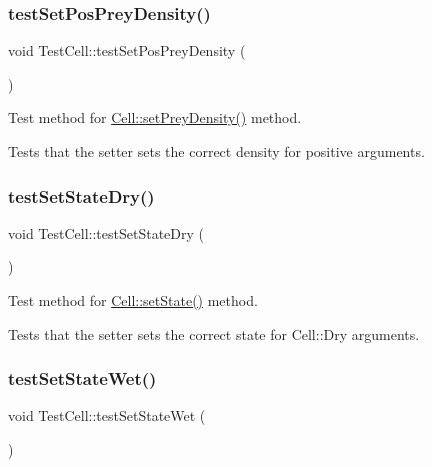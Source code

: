 \subsubsection{\texorpdfstring{test\+Set\+Pos\+Prey\+Density()}{testSetPosPreyDensity()}}
{\footnotesize\ttfamily void Test\+Cell\+::test\+Set\+Pos\+Prey\+Density (\begin{DoxyParamCaption}{ }\end{DoxyParamCaption})\hspace{0.3cm}{\ttfamily [protected]}}



Test method for \hyperlink{class_cell_afd3a85027b67dfd4295e2e50253c1058}{Cell\+::set\+Prey\+Density()} method. 

Tests that the setter sets the correct density for positive arguments. \mbox{\label{class_test_cell_ab72285a024d96d11fabf2261400cb2b2}} 
\subsubsection{\texorpdfstring{test\+Set\+State\+Dry()}{testSetStateDry()}}
{\footnotesize\ttfamily void Test\+Cell\+::test\+Set\+State\+Dry (\begin{DoxyParamCaption}{ }\end{DoxyParamCaption})\hspace{0.3cm}{\ttfamily [protected]}}



Test method for \hyperlink{class_cell_ac388ff95a4d94da1497847ead859f258}{Cell\+::set\+State()} method. 

Tests that the setter sets the correct state for Cell\+::\+Dry arguments. \mbox{\label{class_test_cell_a62ea1c29983f63087056e0fc374e9fd8}} 
\subsubsection{\texorpdfstring{test\+Set\+State\+Wet()}{testSetStateWet()}}
{\footnotesize\ttfamily void Test\+Cell\+::test\+Set\+State\+Wet (\begin{DoxyParamCaption}{ }\end{DoxyParamCaption})\hspace{0.3cm}{\ttfamily [protected]}}



